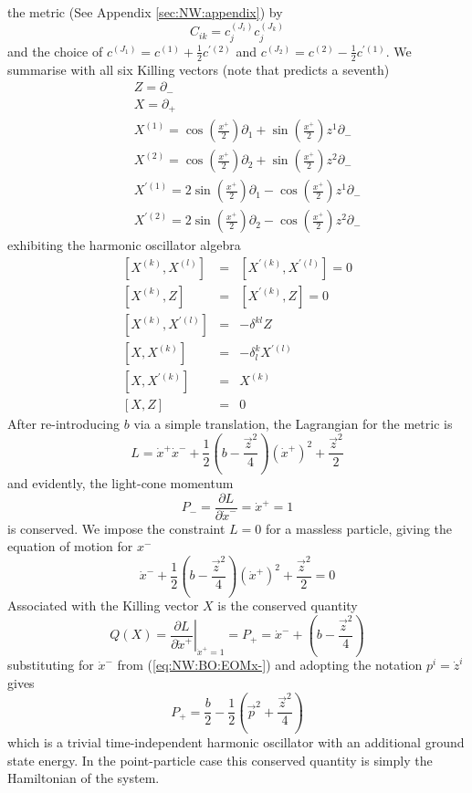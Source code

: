\documentclass[11pt, a4paper, titlepage]{article}
\newcommand{\be}{\begin{equation}}
\newcommand{\ee}{\end{equation}}
\newcommand{\bea}{\begin{eqnarray}}
\newcommand{\eea}{\end{eqnarray}}
\newcommand{\pd}{\partial}
\newcommand{\lb}{\left(}
\newcommand{\rb}{\right)}
\newcommand{\cb}[2]{\left[ #1 , #2 \right]}
\newcommand{\eqn}[1]{(\ref{#1})}
\begin{document}
the metric (See Appendix \ref{sec:NW:appendix}) by
\be
 \label{eq:NW:BO:Rosen:C}
 C_{ik}=c_j^{(J_i)}c_j^{(J_k)}
\ee
and the choice of $c^{(J_1)}=c^{(1)}+\frac{1}{2}c^{\prime(2)}$ and $c^{(J_2)}=c^{(2)}-\frac{1}{2}c^{\prime(1)}$.
We summarise with all six Killing vectors (note that \cite{nw} predicts a
seventh)
\bea
\label{eq:NW:BO:Killing}
 &&Z = \pd_{-} \nonumber \\
 &&X = \pd_{+} \nonumber \\
 &&X^{(1)}=\cos{\lb\frac{x^+}{2}\rb}\pd_1+
         \sin{\lb\frac{x^+}{2}\rb}z^1\pd_- \nonumber \\
 &&X^{(2)}=\cos{\lb\frac{x^+}{2}\rb}\pd_2+
         \sin{\lb\frac{x^+}{2}\rb}z^2\pd_- \nonumber \\
 &&X^{\prime(1)}=2\sin{\lb\frac{x^+}{2}\rb}\pd_1-
          \cos{\lb\frac{x^+}{2}\rb}z^1\pd_- \nonumber \\
 &&X^{\prime(2)}=2\sin{\lb\frac{x^+}{2}\rb}\pd_2-
          \cos{\lb\frac{x^+}{2}\rb}z^2\pd_-
\eea
exhibiting the harmonic oscillator algebra
\bea
 \label{eq:NW:BO:algebra}
 \cb{X^{(k)}}{X^{(l)}}&=&\cb{X^{\prime(k)}}{X^{\prime(l)}}=0 \nonumber \\
 \cb{X^{(k)}}{Z}&=&\cb{X^{\prime(k)}}{Z}=0 \nonumber \\
 \cb{X^{(k)}}{X^{\prime(l)}}&=&-\delta^{kl}Z \nonumber \\
 \cb{X}{X^{(k)}}&=&-\delta^k_lX^{\prime(l)} \nonumber \\
 \cb{X}{X^{\prime(k)}}&=&X^{(k)} \nonumber \\
 \cb{X}{Z}&=&0
\eea
After re-introducing $b$ via a simple translation, the Lagrangian for the
metric is
\be
 \label{eq:NW:BO:Lagrangian}
 L=\dot{x}^+\dot{x}^-
 +\frac{1}{2}\lb b-\frac{\vec{z}^2}{4}\rb\lb\dot{x}^+\rb^2 +\frac{\vec{z}^2}{2}
\ee
and evidently, the light-cone momentum
\be
 \label{eq:NW:BO:P-}
 P_-=\frac{\pd L}{\pd \dot{x}^-}=\dot{x}^+=1
\ee
is conserved. We impose the constraint $L=0$ for a massless particle, giving the
equation of motion for $x^-$
\be
 \label{eq:NW:BO:EOMx-}
 \dot{x}^-
 +\frac{1}{2}\lb b-\frac{\vec{z}^2}{4}\rb\lb\dot{x}^+\rb^2+\frac{\vec{z}^2}{2}=0
\ee
Associated with the Killing vector $X$ is the conserved quantity
\be
 \label{eq:NW:BO:QX}
 Q(X)=\left. \frac{\pd L}{\pd \dot{x}^+} \right|_{\dot{x}^+=1}
     =P_+=\dot{x}^-+\lb b-\frac{\vec{z}^2}{4}\rb
\ee
substituting for $\dot{x}^-$ from \eqn{eq:NW:BO:EOMx-} and adopting the notation
$p^i=\dot{z}^i$ gives
\be
 \label{eq:NW:BO:P+}
 P_+=\frac{b}{2}-\frac{1}{2}\lb \vec{p}^2 + \frac{\vec{z}^2}{4} \rb
\ee
which is a trivial time-independent harmonic oscillator with an additional
ground state energy. In the point-particle case this conserved quantity is
simply the Hamiltonian of the system.
\end{document}

